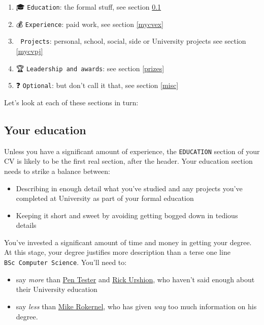 \documentclass[
]{book}
\providecommand{\tightlist}{%
  \setlength{\itemsep}{0pt}\setlength{\parskip}{0pt}}
\begin{document}
\begin{enumerate}
\def\labelenumi{\arabic{enumi}.}
\tightlist
\item
  🎓 \texttt{Education}: the formal stuff, see section \ref{mycved}
\item
  💰 \texttt{Experience}: paid work, see section \ref{mycvex}
\item
  💪 \texttt{Projects}: personal, school, social, side or University projects see section \ref{mycvpj}
\item
  🏆 \texttt{Leadership\ and\ awards}: see section \ref{prizes}
\item
  ❓ \texttt{Optional}: but don't call it that, see section \ref{misc}
\end{enumerate}

Let's look at each of these sections in turn:

\hypertarget{mycved}{%
\subsection{Your education}\label{mycved}}

Unless you have a significant amount of experience, the \texttt{EDUCATION} section of your CV is likely to be the first real section, after the header. Your education section needs to strike a balance between:

\begin{itemize}
\tightlist
\item
  Describing in enough detail what you've studied and any projects you've completed at University as part of your formal education
\item
  Keeping it short and sweet by avoiding getting bogged down in tedious details
\end{itemize}

You've invested a significant amount of time and money in getting your degree. At this stage, your degree justifies more description than a terse one line \texttt{BSc\ Computer\ Science}. You'll need to:

\begin{itemize}
\tightlist
\item
  say \emph{more} than \href{Penelope_Tester.pdf}{Pen Tester} and \href{Rick_Urshion.pdf}{Rick Urshion}, who haven't said enough about their University education
\item
  say \emph{less} than \href{Mike_Rokernel.pdf}{Mike Rokernel}, who has given \emph{way} too much information on his degree.
\end{itemize}
\end{document}
